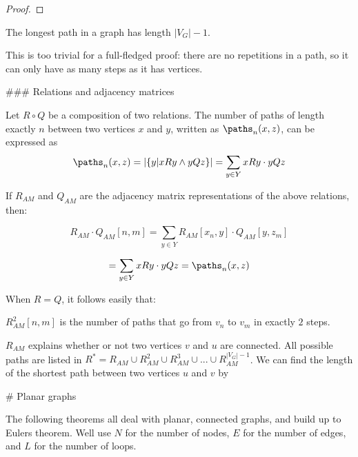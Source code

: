 \begin{proof}
\end{proof}

\begin{theorem}
    The longest path in a graph has length $ | V_G | - 1 $.
\end{theorem}
This is too trivial for a full-fledged proof: there are no repetitions in a path, so it can only have as many steps as it has vertices.


### Relations and adjacency matrices

Let $R \circ Q$ be a composition of two relations. The number of paths of length exactly $n$ between two vertices $x$ and $y$, written as $\paths_n(x, z)$, can be expressed  as 
 $$ \paths_n(x,z) = | \{ y | xRy \land yQz \} | = \sum_{y \in Y} xRy \cdot yQz$$


If $R_{AM}$ and $Q_{AM}$ are the adjacency matrix representations of the above relations, then: 

$$  R_{AM} \cdot Q_{AM} [n,m] = \sum_{y \in Y} R_{AM} [x_n, y] \cdot Q_{AM} [y, z_m] $$

$$ = \sum_{y \in Y} xRy \cdot yQz = \paths_n(x,z) $$

When $R=Q$, it follows easily that:

\begin{theorem}
    $R_{AM}^2 [n,m]$ is the number of paths  that go from $v_n$ to $v_m$ in exactly $2$ steps.
\end{theorem}

\begin{theorem} \label{all_possible_paths}
    $R_{AM}$ explains whether or not two vertices $v$ and $u$ are connected. All possible paths are listed in $R^* = R_{AM} \cup R_{AM}^2 \cup R_{AM}^3 \cup ... \cup R_{AM}^{|V_G|-1}$.
    We can find the length of the shortest path between two vertices $u$ and $v$ by
\end{theorem}



# Planar graphs

The following theorems all deal with planar, connected graphs, and build up to Eulers theorem. Well use $N$ for the number of nodes, $E$ for the number of edges, and $L$ for the number of loops.

